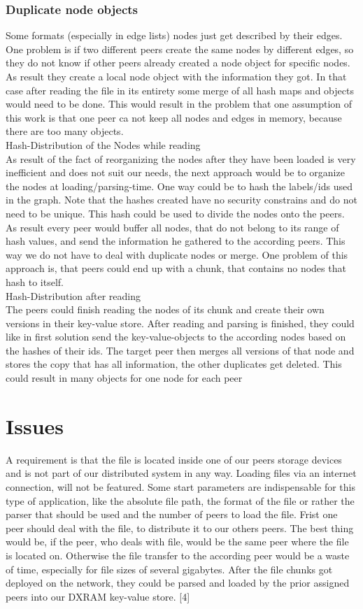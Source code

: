 \subsubsection{Duplicate node objects}
Some formats (especially in edge lists) nodes just get described by their edges. One problem is if two different peers create the same nodes by different edges, so they do not know if other peers already created a node object for specific nodes. As result they create a local node object with the information they got. In that case after reading the file in its entirety some merge of all hash maps and objects would need to be done. This would result in the problem that one assumption of this work is that one peer ca not keep all nodes and edges in memory, because there are too many objects.\\
Hash-Distribution of the Nodes while reading\\
As result of the fact of reorganizing the nodes after they have been loaded is very inefficient and does not suit our needs, the next approach would be to organize the nodes at loading/parsing-time.
One way could be to hash the labels/ids used in the graph. Note that the hashes created have no security constrains and do not need to be unique. This hash could be used to divide the nodes onto the peers. As result every peer would buffer all nodes, that do not belong to its range of hash values, and send the information he gathered to the according peers. This way we do not have to deal with duplicate nodes or merge. One problem of this approach is, that peers could end up with a chunk, that contains no nodes that hash to itself.\\
Hash-Distribution after reading\\
The peers could finish reading the nodes of its chunk and create their own versions in their key-value store. After reading and parsing is finished, they could like in first solution send the key-value-objects to the according nodes based on the hashes of their ids. The target peer then merges all versions of that node and stores the copy that has all information, the other duplicates get deleted. This could result in many objects for one node for each peer

\section{Issues}
A requirement is that the file is located inside one of our peers storage devices and is not part of our distributed system in any way. Loading files via an internet connection, will not be featured. Some start parameters are indispensable for this type of application, like the absolute file path, the format of the file or rather the parser that should be used and the number of peers to load the file.
Frist one peer should deal with the file, to distribute it to our others peers. The best thing would be, if the peer, who deals with file, would be the same peer where the file is located on. Otherwise the file transfer to the according peer would be a waste of time, especially for file sizes of several gigabytes. After the file chunks got deployed on the network, they could be parsed and loaded by the prior assigned peers into our DXRAM key-value store. [4]


